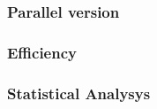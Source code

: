 %



%
%
%
%

\subsubsection*{Parallel version}
\subsubsection*{Efficiency} 
\subsubsection*{Statistical Analysys}